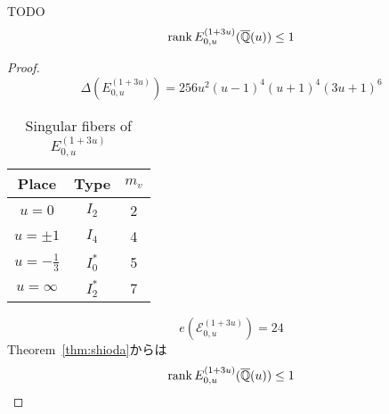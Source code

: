 \documentclass[main]{subfiles}
\begin{document}
\begin{thm}
    TODO
    \begin{equation}
        \operatorname{rank} E_{0,u}^{(1 + 3u)}(\overline{\mathbb{Q}}(u)) \leq 1
    \end{equation}
\end{thm}
\begin{proof}
    \begin{equation}
        \Delta(E_{0,u}^{(1 + 3u)}) = 256u^{2}(u - 1)^{4}(u + 1)^{4}(3u + 1)^{6}
    \end{equation}
    \begin{table}[h]
        \centering
        \caption{Singular fibers of $E_{0,u}^{(1 + 3u)}$}
        \begin{tabular}{|c|c|c|}
            \hline
            Place            & Type    & $m_v$ \\
            \hline
            $u=0$            & $I_2$   & 2     \\
            $u=\pm 1$        & $I_4$   & 4     \\
            $u=-\frac{1}{3}$ & $I_0^*$ & 5     \\
            $u=\infty$       & $I_2^*$ & 7     \\
            \hline
        \end{tabular}
        \label{tab:E_{0,u}^{(1 + 3u)}}
    \end{table}
    \begin{equation}
        e(\mathcal{E}_{0,u}^{(1 + 3u)}) = 24
    \end{equation}
    Theorem~\ref{thm:shioda}からは
    \begin{equation}
        \operatorname{rank} E_{0,u}^{(1 + 3u)}(\overline{\mathbb{Q}}(u)) \leq 1
    \end{equation}
\end{proof}
\end{document}
